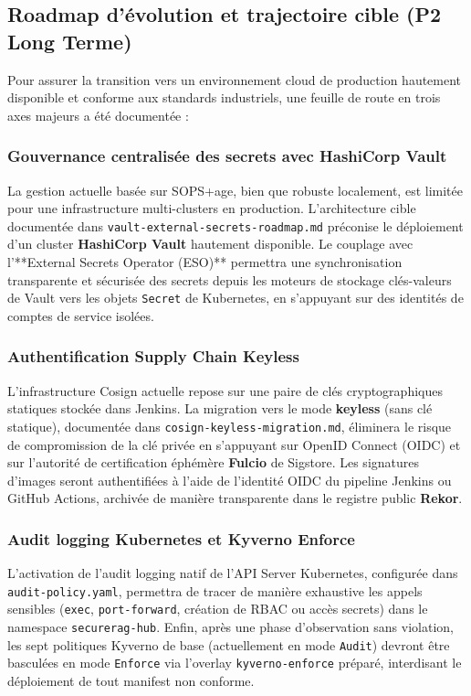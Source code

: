 \subsection{Roadmap d'évolution et trajectoire cible (P2 Long Terme)}
\label{subsec:roadmap-evolution-p2}

Pour assurer la transition vers un environnement cloud de production hautement disponible et conforme aux standards industriels, une feuille de route en trois axes majeurs a été documentée :

\subsubsection{Gouvernance centralisée des secrets avec HashiCorp Vault}
La gestion actuelle basée sur SOPS+age, bien que robuste localement, est limitée pour une infrastructure multi-clusters en production. L'architecture cible documentée dans \texttt{vault-external-secrets-roadmap.md} préconise le déploiement d'un cluster \textbf{HashiCorp Vault} hautement disponible. Le couplage avec l'**External Secrets Operator (ESO)** permettra une synchronisation transparente et sécurisée des secrets depuis les moteurs de stockage clés-valeurs de Vault vers les objets \texttt{Secret} de Kubernetes, en s'appuyant sur des identités de comptes de service isolées.

\subsubsection{Authentification Supply Chain Keyless}
L'infrastructure Cosign actuelle repose sur une paire de clés cryptographiques statiques stockée dans Jenkins. La migration vers le mode \textbf{keyless} (sans clé statique), documentée dans \texttt{cosign-keyless-migration.md}, éliminera le risque de compromission de la clé privée en s'appuyant sur OpenID Connect (OIDC) et sur l'autorité de certification éphémère \textbf{Fulcio} de Sigstore. Les signatures d'images seront authentifiées à l'aide de l'identité OIDC du pipeline Jenkins ou GitHub Actions, archivée de manière transparente dans le registre public \textbf{Rekor}.

\subsubsection{Audit logging Kubernetes et Kyverno Enforce}
L'activation de l'audit logging natif de l'API Server Kubernetes, configurée dans \texttt{audit-policy.yaml}, permettra de tracer de manière exhaustive les appels sensibles (\texttt{exec}, \texttt{port-forward}, création de RBAC ou accès secrets) dans le namespace \texttt{securerag-hub}. Enfin, après une phase d'observation sans violation, les sept politiques Kyverno de base (actuellement en mode \texttt{Audit}) devront être basculées en mode \texttt{Enforce} via l'overlay \texttt{kyverno-enforce} préparé, interdisant le déploiement de tout manifest non conforme.

